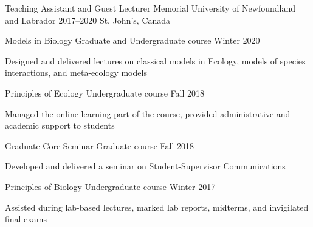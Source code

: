\begin{cventries}
  \cventry
    {Teaching Assistant and Guest Lecturer} %
    {Memorial University of Newfoundland and Labrador} %
    {2017--2020} %
    {St. John's, Canada} %
    {
      \begin{cvsubentries}
       \cvsubentry
         {Models in Biology}
         {\footnotesize Graduate and Undergraduate course}
         {Winter 2020}
         {
         \begin{cvitems}
          \item Designed and delivered lectures on classical models in Ecology, models of species interactions, and meta-ecology models
         \end{cvitems} 
         }
       \cvsubentry
         {Principles of Ecology}
         {\footnotesize Undergraduate course}
         {Fall 2018}
         {
         \begin{cvitems}
          \item Managed the online learning part of the course, provided administrative and academic support to students
         \end{cvitems} 
         }
       \cvsubentry
         {Graduate Core Seminar}
         {\footnotesize Graduate course}
         {Fall 2018}
         {
         \begin{cvitems}
          \item Developed and delivered a seminar on Student-Supervisor Communications
         \end{cvitems} 
         }  
       \cvsubentry
         {Principles of Biology}
         {\footnotesize Undergraduate course}
         {Winter 2017}
         {
         \begin{cvitems}
          \item Assisted during lab-based lectures, marked lab reports, midterms, and invigilated final exams
         \end{cvitems} 
         }
      \end{cvsubentries}
    }


\end{cventries}
